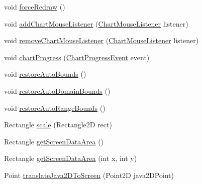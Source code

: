 \begin{DoxyCompactItemize}
\item 
void \mbox{\hyperlink{classorg_1_1jfree_1_1experimental_1_1chart_1_1swt_1_1_chart_composite_a84b6fdd58c7b3ae570ba49de28a6e4d2}{force\+Redraw}} ()
\item 
void \mbox{\hyperlink{classorg_1_1jfree_1_1experimental_1_1chart_1_1swt_1_1_chart_composite_a5c74ff96f57796d015b21c4d9e7c2278}{add\+Chart\+Mouse\+Listener}} (\mbox{\hyperlink{interfaceorg_1_1jfree_1_1chart_1_1_chart_mouse_listener}{Chart\+Mouse\+Listener}} listener)
\item 
void \mbox{\hyperlink{classorg_1_1jfree_1_1experimental_1_1chart_1_1swt_1_1_chart_composite_afbe2d3aaf9b83cf724713ad7f7d3de84}{remove\+Chart\+Mouse\+Listener}} (\mbox{\hyperlink{interfaceorg_1_1jfree_1_1chart_1_1_chart_mouse_listener}{Chart\+Mouse\+Listener}} listener)
\item 
void \mbox{\hyperlink{classorg_1_1jfree_1_1experimental_1_1chart_1_1swt_1_1_chart_composite_a1cb57ed2b46ce82a5da55e2d44ff6cdd}{chart\+Progress}} (\mbox{\hyperlink{classorg_1_1jfree_1_1chart_1_1event_1_1_chart_progress_event}{Chart\+Progress\+Event}} event)
\item 
void \mbox{\hyperlink{classorg_1_1jfree_1_1experimental_1_1chart_1_1swt_1_1_chart_composite_a034a51178307f901baa80b289b1ff229}{restore\+Auto\+Bounds}} ()
\item 
void \mbox{\hyperlink{classorg_1_1jfree_1_1experimental_1_1chart_1_1swt_1_1_chart_composite_a2e15a66924199d5b3cec8eecd1061cd4}{restore\+Auto\+Domain\+Bounds}} ()
\item 
void \mbox{\hyperlink{classorg_1_1jfree_1_1experimental_1_1chart_1_1swt_1_1_chart_composite_afd9c10f86df0aae208c9beb6689063f4}{restore\+Auto\+Range\+Bounds}} ()
\item 
Rectangle \mbox{\hyperlink{classorg_1_1jfree_1_1experimental_1_1chart_1_1swt_1_1_chart_composite_afbd4332031a9c3a8f6ee25a210ddc53c}{scale}} (Rectangle2D rect)
\item 
Rectangle \mbox{\hyperlink{classorg_1_1jfree_1_1experimental_1_1chart_1_1swt_1_1_chart_composite_ac67a93d4bdfa0d52831ff2e076a07449}{get\+Screen\+Data\+Area}} ()
\item 
Rectangle \mbox{\hyperlink{classorg_1_1jfree_1_1experimental_1_1chart_1_1swt_1_1_chart_composite_af447220624a64467cbdf99a81d2b64ef}{get\+Screen\+Data\+Area}} (int x, int y)
\item 
Point \mbox{\hyperlink{classorg_1_1jfree_1_1experimental_1_1chart_1_1swt_1_1_chart_composite_a4558c784478634685144fb83a21b2349}{translate\+Java2\+D\+To\+Screen}} (Point2D java2\+D\+Point)

\end{DoxyCompactItemize}

